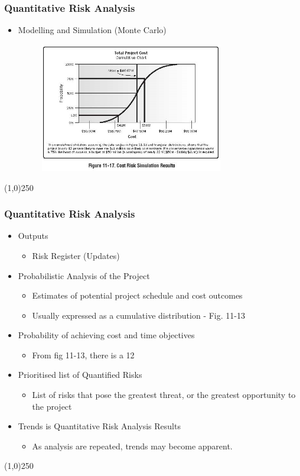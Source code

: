 \begin{frame}
\frametitle{Quantitative Risk Analysis}
\begin{itemize}
\item Modelling and Simulation (Monte Carlo)
\begin{figure}
	\centering
		\includegraphics[width = 8cm]{images/Fig11-17.jpg}
	\label{fig:11-17}
\end{figure}
\end{itemize}
\end{frame}\begin{center}\line(1,0){250}\end{center}



\begin{frame}
\frametitle{Quantitative Risk Analysis}
\begin{itemize}
\item Outputs
\begin{itemize}
	\item Risk Register (Updates)
\end{itemize}
\item Probabilistic Analysis of the Project
\begin{itemize}
	\item Estimates of potential project schedule and cost outcomes
\item Usually expressed as a cumulative distribution 
- Fig. 11-13
\end{itemize}
\item Probability of achieving cost and time objectives
\begin{itemize}
	\item From fig 11-13, there is a 12%
\end{itemize}
\item Prioritised list of Quantified Risks
\begin{itemize}
	\item List of risks that pose the greatest threat, or the greatest opportunity to the project
\end{itemize}
\item Trends is Quantitative Risk Analysis Results
\begin{itemize}
	\item As analysis are repeated, trends may become apparent.
\end{itemize}
\end{itemize}
\end{frame}\begin{center}\line(1,0){250}\end{center}




